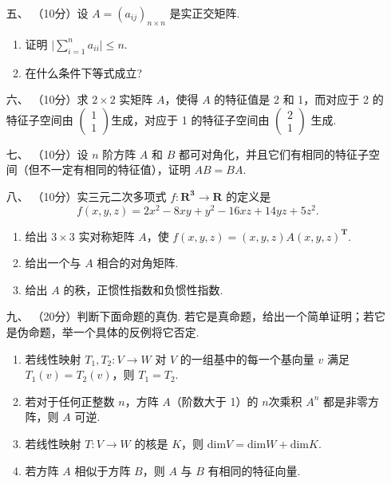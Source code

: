 \begin{enumerate}
    \item [五、]（10分）设 $A=(a_{ij})_{n\times n}$ 是实正交矩阵.
    \begin{enumerate}[label=(\arabic*)]
        \item 证明 $\lvert\sum\limits_{i=1}^n{a_{ii}}\rvert \leqslant n$.

        \item 在什么条件下等式成立?
    \end{enumerate}

\item [六、]（10分）求 $2\times 2$ 实矩阵 $A$，使得 $A$ 的特征值是 2 和 1，而对应于 2 的特征子空间由 $\begin{pmatrix}1 \\ 1\end{pmatrix}$生成，对应于 1 的特征子空间由 $\begin{pmatrix}2 \\ 1\end{pmatrix}$ 生成.

    \item [七、]（10分）设 $n$ 阶方阵 $A$ 和 $B$ 都可对角化，并且它们有相同的特征子空间（但不一定有相同的特征值），证明 $AB=BA$.

    \item [八、]（10分）实三元二次多项式 $f:\mathbf{R^3}\to \mathbf{R}$ 的定义是
    \[f(x,y,z) = 2x^2-8xy+y^2-16xz+14yz+5z^2.\]
    \begin{enumerate}[label=(\arabic*)]
        \item 给出 $3\times 3$ 实对称矩阵 $A$，使 $f(x,y,z) = (x,y,z)A(x,y,z)^{\mathbf{T}}$.

        \item 给出一个与 $A$ 相合的对角矩阵.

        \item 给出 $A$ 的秩，正惯性指数和负惯性指数.
    \end{enumerate}

\item [九、]（20分）判断下面命题的真伪. 若它是真命题，给出一个简单证明；若它是伪命题，举一个具体的反例将它否定.
    \begin{enumerate}[label=(\arabic*)]
        \item 若线性映射 $T_1,T_2:V \to W$ 对 $V$ 的一组基中的每一个基向量 $v$ 满足 $T_1(v)=T_2(v)$，则 $T_1=T_2$.

        \item 若对于任何正整数 $n$，方阵 $A$（阶数大于 1）的 $n$次乘积 $A^n$ 都是非零方阵，则 $A$ 可逆.

        \item 若线性映射 $T:V\to W$ 的核是 $K$，则 $\mathrm{dim}V=\mathrm{dim}W+\mathrm{dim}K$.

        \item 若方阵 $A$ 相似于方阵 $B$，则 $A$ 与 $B$ 有相同的特征向量.
    \end{enumerate}
\end{enumerate}

\clearpage
